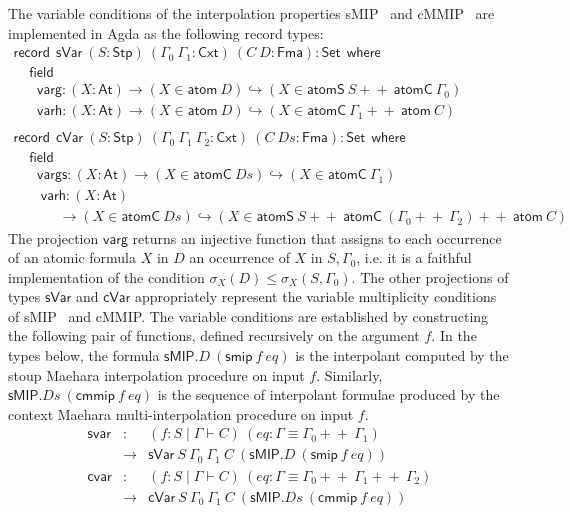 \documentclass[sn-mathphys-num]{sn-jnl}%
\newcommand{\GG}{\Gamma}
\newcommand{\gs}[1]{\sigma_{X} (#1)}
\newcommand{\sMIP}{\textsf{sMIP}}
\newcommand{\cMMIP}{\textsf{cMMIP}}
\newcommand{\append}{+\!\!+}
\newcommand{\At}{\mathsf{At}}
\newcommand{\Fma}{\mathsf{Fma}}
\newcommand{\where}{\mathsf{where}}
\newcommand{\Set}{\mathsf{Set}}
\newcommand{\record}{\mathsf{record}}
\newcommand{\field}{\mathsf{field}}
\newcommand{\Stp}{\mathsf{Stp}}
\newcommand{\Cxt}{\mathsf{Cxt}}
\theoremstyle{thmstyleone}%
\theoremstyle{thmstyletwo}%
\theoremstyle{thmstylethree}%
\begin{document}
The variable conditions of the interpolation properties \sMIP~ and \cMMIP~ are implemented in Agda as the following record types:
\[
\begin{array}{l}
  \record \:\:  \mathsf{sVar} ~(S : \Stp) ~(\GG_0 ~\GG_1 : \Cxt) ~(C ~D : \Fma) : \Set \:\: \where \\
  \;\;\;\; \field \\
  \;\;\;\; \;\; \mathsf{varg} : (X : \At) \to (X \in \mathsf{atom}~D) \hookrightarrow (X \in \mathsf{atomS} ~S \append ~\mathsf{atomC} ~\Gamma_0) \\
  \;\;\;\; \;\; \mathsf{varh} : (X : \At) \to (X \in \mathsf{atom}~D) \hookrightarrow (X \in \mathsf{atomC} ~\GG_1 \append ~\mathsf{atom} ~C) \\ \\
  \record \:\:  \mathsf{cVar} ~(S : \Stp) ~(\GG_0 ~\GG_1 ~\GG_2: \Cxt) ~(C ~Ds : \Fma) : \Set \:\: \where \\
  \;\;\;\; \field \\
  \;\;\;\; \;\; \mathsf{vargs} : (X : \At) \to (X \in \mathsf{atomC}~Ds) \hookrightarrow (X \in \mathsf{atomC} ~\GG_1)  \\
  \;\;\;\;\; \;\; \mathsf{varh} : (X : \At) \\
  \;\;\;\; \;\; \;\;\;\;\;\,\to (X \in \mathsf{atomC}~Ds) \hookrightarrow (X \in \mathsf{atomS} ~S \append~ \mathsf{atomC} ~(\GG_0 \append~ \GG_2) \append~ \mathsf{atom} ~C)
\end{array}
\]
The projection $\mathsf{varg}$ returns an injective function that assigns to each occurrence of an atomic formula $X$ in $D$ an occurrence of $X$ in $S,\Gamma_0$, i.e. it is a faithful implementation of the condition $\gs{D} \leq \gs{S , \GG_0}$. The other projections of types $\mathsf{sVar}$ and $\mathsf{cVar}$ appropriately represent the variable multiplicity conditions of \sMIP~ and \cMMIP.
The variable conditions are established by constructing the following pair of functions, defined recursively on the argument $f$.
In the types below, the formula $\sMIP.D~(\mathsf{smip}~f~eq)$ is the interpolant computed by the stoup Maehara interpolation procedure on input $f$. Similarly, $\sMIP.Ds~(\mathsf{cmmip}~f~eq)$ is the sequence of interpolant formulae produced by the context
Maehara multi-interpolation procedure on input $f$.
\[
\begin{array}{rcl}
\mathsf{svar} & : & (f : S \mid \Gamma \vdash C)
~(eq : \Gamma \equiv \Gamma_0 \append ~\Gamma_1) \\
&\to& \mathsf{sVar} ~S~\Gamma_0~\Gamma_1~C~(\sMIP.D~(\mathsf{smip}~f~eq))
\\[4pt]
\mathsf{cvar} & : & (f : S \mid \Gamma \vdash C)
~(eq : \Gamma \equiv \Gamma_0 \append ~\Gamma_1 \append ~\Gamma_2) \\
& \to&  \mathsf{cVar} ~S~\Gamma_0~\Gamma_1~C~(\sMIP.Ds~(\mathsf{cmmip}~f~eq))
\end{array}
\]
\end{document}

